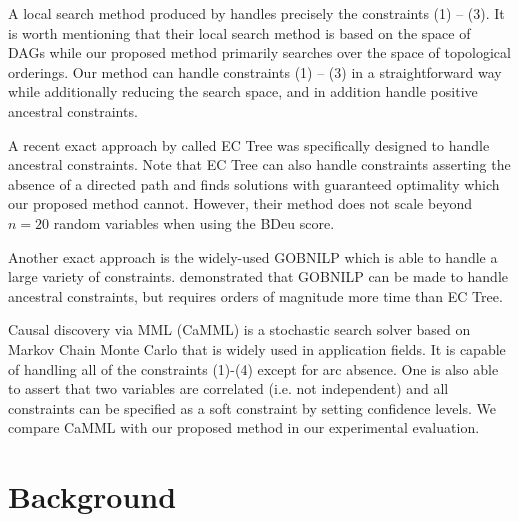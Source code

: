 \documentclass[twoside,11pt]{article}
\begin{document}
\smallskip
A local search method produced by \cite{CamposC07} handles precisely the constraints (1) -- (3). It is
worth mentioning that their local search method is based on the space of DAGs while our proposed method primarily searches
over the space of topological orderings. Our method can handle constraints (1) -- (3) in a straightforward way while additionally 
reducing the search space, and in addition handle positive ancestral constraints.

\smallskip
A recent exact approach by \cite{Chen2016} called EC Tree was specifically designed to handle ancestral constraints. Note
that EC Tree can also handle constraints asserting the absence of a directed path and finds solutions with guaranteed optimality
which our proposed method cannot. However, their method does not scale beyond $n = 20$ random variables when using the BDeu score.

\smallskip
Another exact approach is the widely-used GOBNILP \citep{Bartlett2017} which is able to handle a large variety of
constraints. \cite{Chen2016} demonstrated that GOBNILP can be made to handle ancestral constraints, but requires orders of magnitude
more time than EC Tree.

\smallskip
Causal discovery via MML (CaMML) \citep{Korb2010} is a stochastic search solver based on Markov Chain Monte Carlo
that is widely used in application fields. It is capable of handling all of the constraints (1)-(4) except for arc absence. One is also able to
assert that two variables are correlated (i.e. not independent) and all constraints can be specified as a soft constraint by setting confidence levels. We
compare CaMML with our proposed method in our experimental evaluation. 


%
%
\section{Background}
\label{SECTION:Background}
\end{document}
